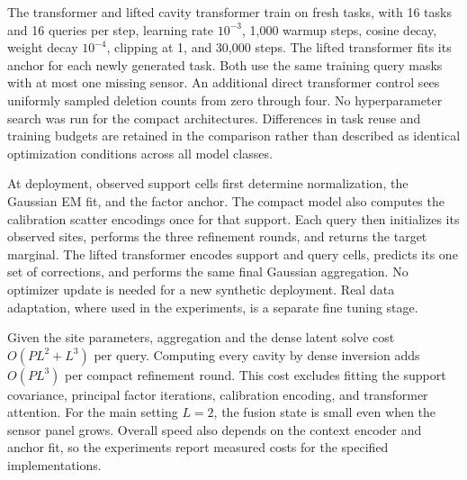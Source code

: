The transformer and lifted cavity transformer train on fresh tasks, with 16 tasks and 16 queries per step, learning rate $10^{-3}$, 1,000 warmup steps, cosine decay, weight decay $10^{-4}$, clipping at 1, and 30,000 steps. The lifted transformer fits its anchor for each newly generated task. Both use the same training query masks with at most one missing sensor. An additional direct transformer control sees uniformly sampled deletion counts from zero through four. No hyperparameter search was run for the compact architectures. Differences in task reuse and training budgets are retained in the comparison rather than described as identical optimization conditions across all model classes.

At deployment, observed support cells first determine normalization, the Gaussian EM fit, and the factor anchor. The compact model also computes the calibration scatter encodings once for that support. Each query then initializes its observed sites, performs the three refinement rounds, and returns the target marginal. The lifted transformer encodes support and query cells, predicts its one set of corrections, and performs the same final Gaussian aggregation. No optimizer update is needed for a new synthetic deployment. Real data adaptation, where used in the experiments, is a separate fine tuning stage.

Given the site parameters, aggregation and the dense latent solve cost $O(P L^2+L^3)$ per query. Computing every cavity by dense inversion adds $O(P L^3)$ per compact refinement round. This cost excludes fitting the support covariance, principal factor iterations, calibration encoding, and transformer attention. For the main setting $L=2$, the fusion state is small even when the sensor panel grows. Overall speed also depends on the context encoder and anchor fit, so the experiments report measured costs for the specified implementations.
